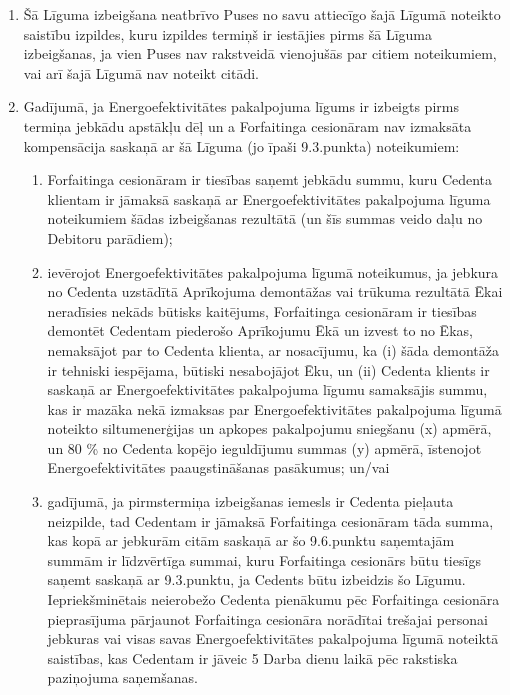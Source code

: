 \documentclass[a4paper]{article}
\begin{document}
\begin{multicols}{2}
\begin{enumerate}
  \item{Šā Līguma izbeigšana neatbrīvo Puses no savu attiecīgo šajā Līgumā
noteikto saistību izpildes, kuru izpildes termiņš ir iestājies pirms šā
Līguma izbeigšanas, ja vien Puses nav rakstveidā vienojušās par citiem
noteikumiem, vai arī šajā Līgumā nav noteikt citādi. }

  \item{Gadījumā, ja Energoefektivitātes pakalpojuma līgums ir izbeigts pirms
termiņa jebkādu apstākļu dēļ un a Forfaitinga cesionāram nav
izmaksāta kompensācija saskaņā ar šā Līguma (jo īpaši 9.3.punkta)
noteikumiem:}

    \begin{enumerate}
    \item{Forfaitinga cesionāram ir tiesības saņemt jebkādu summu, kuru
Cedenta klientam ir jāmaksā saskaņā ar Energoefektivitātes
pakalpojuma līguma noteikumiem šādas izbeigšanas rezultātā (un šīs
summas veido daļu no Debitoru parādiem);}

    \item{ievērojot Energoefektivitātes pakalpojuma līgumā noteikumus,
ja jebkura no Cedenta uzstādītā Aprīkojuma demontāžas vai trūkuma
rezultātā Ēkai neradīsies nekāds būtisks kaitējums, Forfaitinga
cesionāram ir tiesības demontēt Cedentam piederošo Aprīkojumu Ēkā
un izvest to no Ēkas, nemaksājot par to Cedenta klienta, ar nosacījumu,
ka (i) šāda demontāža ir tehniski iespējama, būtiski nesabojājot Ēku, un
(ii) Cedenta klients ir saskaņā ar Energoefektivitātes pakalpojuma
līgumu samaksājis summu, kas ir mazāka nekā izmaksas par
Energoefektivitātes pakalpojuma līgumā noteikto siltumenerģijas un
apkopes pakalpojumu sniegšanu (x) apmērā, un 80 \% no Cedenta
kopējo ieguldījumu summas (y) apmērā, īstenojot Energoefektivitātes
paaugstināšanas pasākumus; un/vai}

    \item{gadījumā, ja pirmstermiņa izbeigšanas iemesls ir Cedenta
pieļauta neizpilde, tad Cedentam ir jāmaksā Forfaitinga cesionāram
tāda summa, kas kopā ar jebkurām citām saskaņā ar šo 9.6.punktu
saņemtajām summām ir līdzvērtīga summai, kuru Forfaitinga cesionārs
būtu tiesīgs saņemt saskaņā ar 9.3.punktu, ja Cedents būtu izbeidzis šo
Līgumu. Iepriekšminētais neierobežo Cedenta pienākumu pēc
Forfaitinga cesionāra pieprasījuma pārjaunot Forfaitinga cesionāra
norādītai trešajai personai jebkuras vai visas savas Energoefektivitātes
pakalpojuma līgumā noteiktā saistības, kas Cedentam ir jāveic 5 Darba
dienu laikā pēc rakstiska paziņojuma saņemšanas.}
    \end{enumerate}


\end{enumerate}
\end{multicols}
\end{document}

